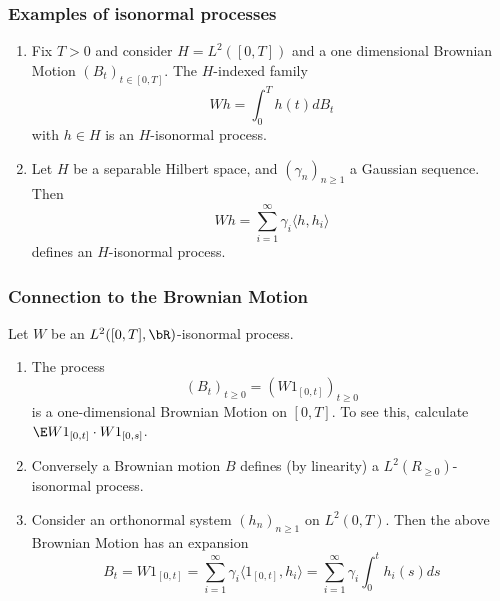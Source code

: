 \begin{frame}
    \frametitle{Examples of isonormal processes}
    
    \begin{enumerate}
        \item Fix $T>0$ and consider $H = L^2 ([0,T])$ and a one dimensional
            Brownian Motion $(B_t)_{t\in [0,T]}$. The $H$-indexed family
            \begin{equation*}
                W h = \int_{0}^{T} h(t) d B_t
            \end{equation*}
            with $h\in H$ is an $H$-isonormal process.
        \item Let $H$ be a separable Hilbert space, and $(\gamma_n)_{n \geq 1}$
            a Gaussian sequence. Then
            \begin{equation*}
                W h = \sum_{i=1}^{\infty} \gamma_i \langle h, h_i \rangle
            \end{equation*}
            defines an $H$-isonormal process. 
    \end{enumerate}
\end{frame}


\begin{frame}
    \frametitle{Connection to the Brownian Motion}
    
    Let $W$ be an $L^2([0,T], \bR)$-isonormal process. 

    \begin{enumerate}
        \item The process
            \begin{equation*}
                    (B_t)_{t\geq 0}=\left( W 1_{[0,t]} \right)_{t \geq 0}
            \end{equation*}
            is a one-dimensional Brownian Motion on $[0,T]$. To see this,
            calculate $\E W 1_{[0,t]} \cdot{} W 1_{[0,s]}$.
        \item Conversely a Brownian motion $B$ defines (by linearity) a
            $L^2(R_{\geq 0})$-isonormal process.
        \item Consider an orthonormal system $(h_n)_{n\geq 1}$ on $L^2(0,T)$.  
            Then the above Brownian Motion has an expansion 
            \begin{equation*}
                B_t = W 1_{[0,t]} = 
                \sum_{i=1}^{\infty} \gamma_i \langle 1_{[0,t]}, h_i \rangle 
                = \sum_{i=1}^{\infty} \gamma_i \int_{0}^{t} h_i(s) ds
            \end{equation*}
    \end{enumerate} 
\end{frame}


